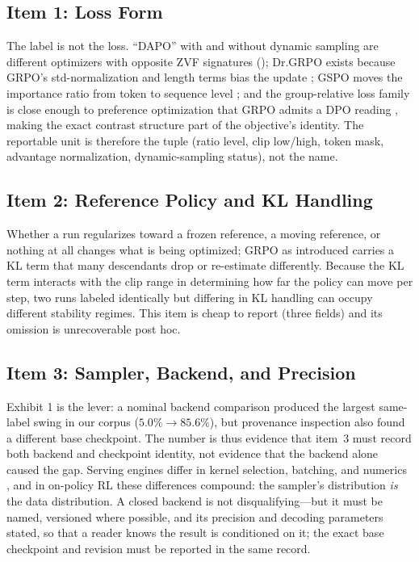 \subsection{Item 1: Loss Form}
\label{sec:p5-item1}
The label is not the loss. ``DAPO'' with and without dynamic sampling are
different optimizers with opposite ZVF signatures
(); Dr.GRPO exists because GRPO's
std-normalization and length terms bias the update \citep{tong2025drgrpo};
GSPO moves the importance ratio from token to sequence level
\citep{qwen2025gspo}; and the group-relative loss family is close enough to
preference optimization that GRPO admits a DPO reading
\citep{rafailov2024direct, wu2025grpodpo}, making the exact contrast structure
part of the objective's identity. The reportable unit is therefore the tuple
(ratio level, clip low/high, token mask, advantage normalization,
dynamic-sampling status), not the name.

\subsection{Item 2: Reference Policy and KL Handling}
\label{sec:p5-item2}
Whether a run regularizes toward a frozen reference, a moving reference, or
nothing at all changes what is being optimized; GRPO as introduced carries a
KL term \citep{shao2024deepseekmath} that many descendants drop or re-estimate
differently. Because the KL term interacts with the clip range in determining
how far the policy can move per step, two runs labeled identically but
differing in KL handling can occupy different stability regimes. This item is
cheap to report (three fields) and its omission is unrecoverable post hoc.

\subsection{Item 3: Sampler, Backend, and Precision}
\label{sec:p5-item3}
Exhibit 1 is the lever: a nominal backend comparison produced the largest
same-label swing in our corpus ($5.0\% \to 85.6\%$), but provenance inspection
also found a different base checkpoint. The number is thus evidence that item~3
must record both backend and checkpoint identity, not evidence that the backend
alone caused the gap. Serving engines differ in kernel
selection, batching, and numerics \citep{kwon2023vllm, zheng2024sglang,
dao2022flashattention}, and in on-policy RL these differences compound: the
sampler's distribution \emph{is} the data distribution. A closed backend is
not disqualifying---but it must be named, versioned where possible, and its
precision and decoding parameters stated, so that a reader knows the result is
conditioned on it; the exact base checkpoint and revision must be reported in
the same record.

